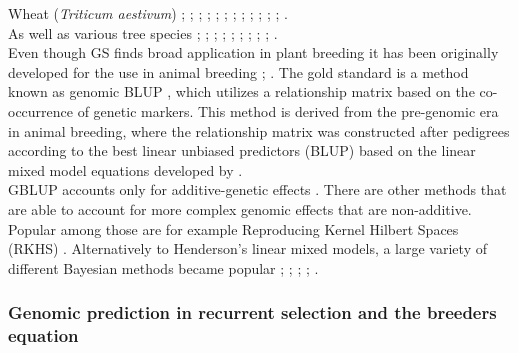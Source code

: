 Wheat (\textit{Triticum aestivum}) \cite{Thavamanikumar_2015}; \cite{Lopez_Cruz_2015};
\cite{Sukumaran_2016}; \cite{Bustos_Korts_2016}; \cite{Gianola_2016_wheat};
\cite{Crossa_2016_wheat}; \cite{Rincent_2018}; \cite{Norman_2018}; \cite{Belamkar_2018};
\cite{Ovenden_2018}; \cite{Cuevas_2019}; \cite{Howard_2019}; \cite{Krause_2019}. \\
As well as various tree species \cite{Holliday_2012}; \cite{Resende_2012}; \cite{Zapata_Valenzuela_2013};  \cite{Jaramillo_Correa_2014}; \cite{Kumar_2015}; \cite{GamalElDien_2016}; \cite{Rincent_2018}; \cite{Ratcliffe_2017}; \cite{Kainer_2018}; \cite{deAlmeidaFilho2019}. \\
Even though GS finds broad application in plant breeding it has been originally developed
for the use in animal breeding \cite{hayes2010genome}; \cite{goddard2011using}. The gold
standard is a method known as genomic BLUP \cite{vanraden2008efficient}, which utilizes a
relationship matrix based on the co-occurrence of genetic markers. This method is derived
from the pre-genomic era in animal breeding, where the relationship matrix was constructed
after pedigrees according to the best linear unbiased predictors (BLUP) based on the linear mixed
model equations developed by \cite{henderson1975best}. \\
GBLUP accounts only for additive-genetic effects \cite{vanraden2008efficient}. There are
other methods that are able to account for more complex genomic effects that are
non-additive. Popular among those are for example Reproducing Kernel Hilbert Spaces (RKHS)
\cite{gianola2008reproducing}. Alternatively to Henderson's linear mixed models, a large
variety of different Bayesian methods became popular \cite{hayes2001}; \cite{gianola2009};
\cite{habier2011}; \cite{gianola2013}; \cite{crossa2017}.

\subsubsection{Genomic prediction in recurrent selection and the breeders equation}

